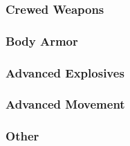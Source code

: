 

\subsubsection*{Crewed Weapons}



\subsubsection*{Body Armor}



\subsubsection*{Advanced Explosives}



\subsubsection*{Advanced Movement}



\subsubsection*{Other}


